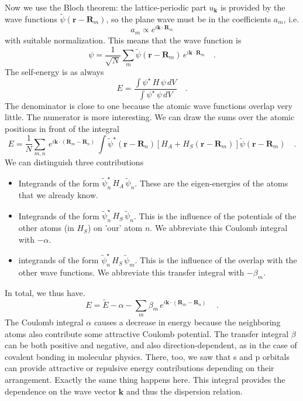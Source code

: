 Now we use the Bloch theorem: the lattice-periodic part $u_\mathbf{k}$ is provided by the wave functions $\tilde{\psi} (\mathbf{r} - \mathbf{R}_m)$, so the plane wave must be in the coefficients $a_m$, i.e.
\begin{equation}
    a_m \propto e^{i \mathbf{k} \cdot \mathbf{R}_m}
\end{equation}
with suitable normalization. This means that the wave function is 
\begin{equation}
    \psi = \frac{1}{\sqrt{N}} \sum_m \tilde{\psi} (\mathbf{r} - \mathbf{R}_m) \, e^{i \mathbf{k} \cdot \mathbf{R}_m} \quad .
\end{equation}
The self-energy is as always
\begin{equation}
    E = \frac{\int \psi^\star \, H \, \psi \, dV }{\int \psi^\star \, \psi \, dV} \quad .
\end{equation}
The denominator is close to one because the atomic wave functions overlap very little. The numerator is more interesting. We can draw the sums over the atomic positions in front of the integral 
\begin{equation}
    E = \frac{1}{N} \sum_{m,n} \, e^{i \mathbf{k} \cdot (\mathbf{R}_m - \mathbf{R}_n) }\,
    \int \tilde{\psi}^\star (\mathbf{r} - \mathbf{R}_n) \left[ H_A + H_S(\mathbf{r} - \mathbf{R}_m) \right] \tilde{\psi} (\mathbf{r} - \mathbf{R}_m) \quad .
\end{equation}
We can distinguish three contributions
\begin{itemize}
\item Integrands of the form $\tilde{\psi}^\star_n \, H_A \, \tilde{\psi}_n$. These are the eigen-energies of the atoms that we already know.
\item Integrands of the form $\tilde{\psi}^\star_n \, H_S \, \tilde{\psi}_n$. This is the influence of the potentials of the other atoms (in $H_S$) on 'our' atom $n$. We abbreviate this Coulomb integral with $-\alpha$.
\item integrands of the form $\tilde{\psi}^\star_n \, H_S \, \tilde{\psi}_m$. This is the influence of the overlap with the other wave functions. 
 We abbreviate this transfer integral with $-\beta_m$.
\end{itemize}    
In total, we thus have.
\begin{equation}
    E = \tilde{E} - \alpha - \sum_m \beta_m \, e^{i \mathbf{k} \cdot (\mathbf{R}_m - \mathbf{R}_n) }\, \quad .
\end{equation}
The Coulomb integral $\alpha$ causes a decrease in energy because the neighboring atoms also contribute some attractive Coulomb potential. The transfer integral $\beta$ can be both positive and negative, and also direction-dependent, as in the case of covalent bonding in molecular physics. There, too, we saw that s and p orbitals can provide attractive or repulsive energy contributions depending on their arrangement. Exactly the same thing happens here. This integral provides the dependence on the wave vector $\mathbf{k}$ and thus the dispersion relation.


